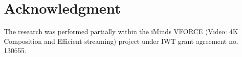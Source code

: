 \documentclass[journal]{IEEEtran}
\begin{document}
\section*{Acknowledgment}


The research was performed partially within the iMinds VFORCE
(Video: 4K Composition and Efficient streaming)
project under IWT grant agreement no. 130655.



\ifCLASSOPTIONcaptionsoff
  \newpage
\fi





%
%
%
%
%



% 
\end{document}
